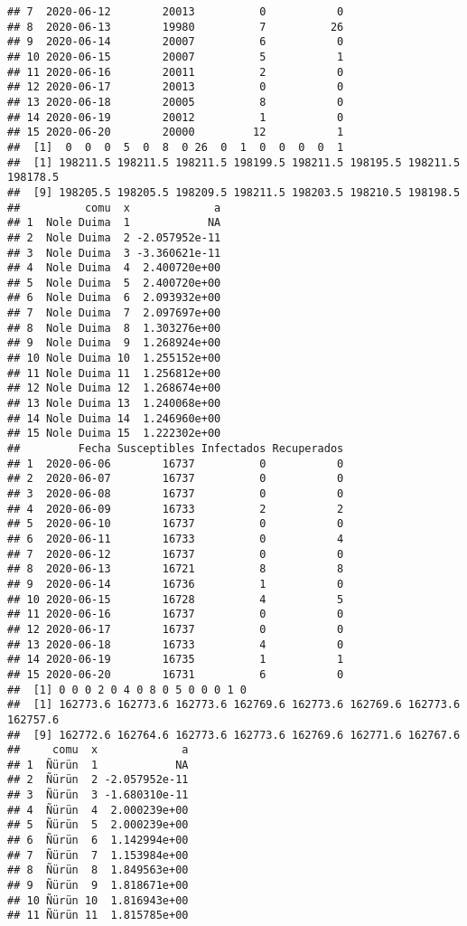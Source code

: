 \documentclass[
]{article}
\begin{document}
\begin{verbatim}
## 7  2020-06-12        20013          0           0
## 8  2020-06-13        19980          7          26
## 9  2020-06-14        20007          6           0
## 10 2020-06-15        20007          5           1
## 11 2020-06-16        20011          2           0
## 12 2020-06-17        20013          0           0
## 13 2020-06-18        20005          8           0
## 14 2020-06-19        20012          1           0
## 15 2020-06-20        20000         12           1
##  [1]  0  0  0  5  0  8  0 26  0  1  0  0  0  0  1
##  [1] 198211.5 198211.5 198211.5 198199.5 198211.5 198195.5 198211.5 198178.5
##  [9] 198205.5 198205.5 198209.5 198211.5 198203.5 198210.5 198198.5
##          comu  x             a
## 1  Nole Duima  1            NA
## 2  Nole Duima  2 -2.057952e-11
## 3  Nole Duima  3 -3.360621e-11
## 4  Nole Duima  4  2.400720e+00
## 5  Nole Duima  5  2.400720e+00
## 6  Nole Duima  6  2.093932e+00
## 7  Nole Duima  7  2.097697e+00
## 8  Nole Duima  8  1.303276e+00
## 9  Nole Duima  9  1.268924e+00
## 10 Nole Duima 10  1.255152e+00
## 11 Nole Duima 11  1.256812e+00
## 12 Nole Duima 12  1.268674e+00
## 13 Nole Duima 13  1.240068e+00
## 14 Nole Duima 14  1.246960e+00
## 15 Nole Duima 15  1.222302e+00
##         Fecha Susceptibles Infectados Recuperados
## 1  2020-06-06        16737          0           0
## 2  2020-06-07        16737          0           0
## 3  2020-06-08        16737          0           0
## 4  2020-06-09        16733          2           2
## 5  2020-06-10        16737          0           0
## 6  2020-06-11        16733          0           4
## 7  2020-06-12        16737          0           0
## 8  2020-06-13        16721          8           8
## 9  2020-06-14        16736          1           0
## 10 2020-06-15        16728          4           5
## 11 2020-06-16        16737          0           0
## 12 2020-06-17        16737          0           0
## 13 2020-06-18        16733          4           0
## 14 2020-06-19        16735          1           1
## 15 2020-06-20        16731          6           0
##  [1] 0 0 0 2 0 4 0 8 0 5 0 0 0 1 0
##  [1] 162773.6 162773.6 162773.6 162769.6 162773.6 162769.6 162773.6 162757.6
##  [9] 162772.6 162764.6 162773.6 162773.6 162769.6 162771.6 162767.6
##     comu  x             a
## 1  Ñürün  1            NA
## 2  Ñürün  2 -2.057952e-11
## 3  Ñürün  3 -1.680310e-11
## 4  Ñürün  4  2.000239e+00
## 5  Ñürün  5  2.000239e+00
## 6  Ñürün  6  1.142994e+00
## 7  Ñürün  7  1.153984e+00
## 8  Ñürün  8  1.849563e+00
## 9  Ñürün  9  1.818671e+00
## 10 Ñürün 10  1.816943e+00
## 11 Ñürün 11  1.815785e+00

\end{verbatim}
\end{document}
